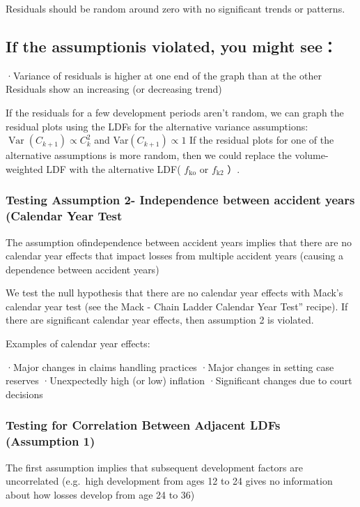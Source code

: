 \documentclass[
]{article}
\begin{document}
Residuals should be random around zero with no significant trends or
patterns.

\subsection{If the assumptionis violated, you might
see：}\label{if-the-assumptionis-violated-you-might-see}

·Variance of residuals is higher at one end of the graph than at the
other Residuals show an increasing (or decreasing trend)

If the residuals for a few development periods aren't random, we can
graph the residual plots using the LDFs for the alternative variance
assumptions: \(\operatorname{Var}(C_{k+1})\propto C_{k}^{2}\) and
Var\((C_{k+1})\propto1\) If the residual plots for one of the
alternative assumptions is more random, then we could replace the
volume-weighted LDF with the alternative LDF( \(f_{\mathrm{ko}}\) or
\(f_{\text{k}2}\) ）.

\subsubsection{Testing Assumption 2- Independence between accident years
(Calendar Year
Test}\label{testing-assumption-2--independence-between-accident-years-calendar-year-test}

The assumption ofindependence between accident years implies that there
are no calendar year effects that impact losses from multiple accident
years (causing a dependence between accident years)

We test the null hypothesis that there are no calendar year effects with
Mack's calendar year test (see the Mack - Chain Ladder Calendar Year
Test'' recipe). If there are significant calendar year effects, then
assumption 2 is violated.

Examples of calendar year effects:

·Major changes in claims handling practices ·Major changes in setting
case reserves ·Unexpectedly high (or low) inflation ·Significant changes
due to court decisions

\subsubsection{Testing for Correlation Between Adjacent LDFs (Assumption
1)}\label{testing-for-correlation-between-adjacent-ldfs-assumption-1}

The first assumption implies that subsequent development factors are
uncorrelated (e.g.~high development from ages 12 to 24 gives no
information about how losses develop from age 24 to 36)
\end{document}
